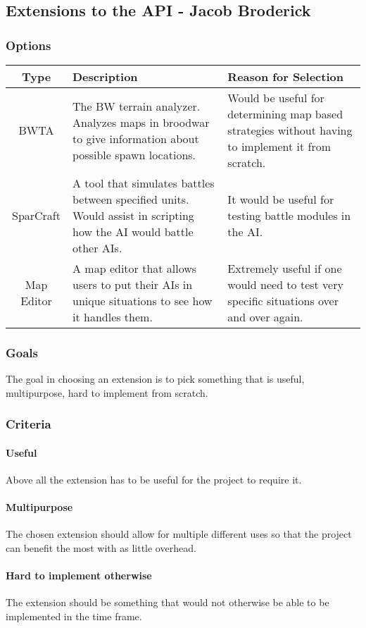 \subsection{Extensions to the API - Jacob Broderick}
\subsubsection{Options}
\begin{center}
	\begin{tabular}{ ||C|L|L|| } 
		\hline
		Type & Description & Reason for Selection \\
		\hline
		BWTA & The BW terrain analyzer. Analyzes maps in broodwar to give information about possible spawn locations. & Would be useful for determining map based strategies without having to implement it from scratch. \\ 
		\hline
		SparCraft & A tool that simulates battles between specified units. Would assist in scripting how the AI would battle other AIs. & It would be useful for testing battle modules in the AI. \\ 
		\hline
		Map Editor & A map editor that allows users to put their AIs in unique situations to see how it handles them. & Extremely useful if one would need to test very specific situations over and over again. \\ 
		\hline
	\end{tabular}
\end{center}
\subsubsection{Goals}
The goal in choosing an extension is to pick something that is useful, multipurpose, hard to implement from scratch.
\subsubsection{Criteria}
\paragraph{Useful}
Above all the extension has to be useful for the project to require it.
\paragraph{Multipurpose}
The chosen extension should allow for multiple different uses so that the project can benefit the most with as little overhead.
\paragraph{Hard to implement otherwise}
The extension should be something that would not otherwise be able to be implemented in the time frame. 
